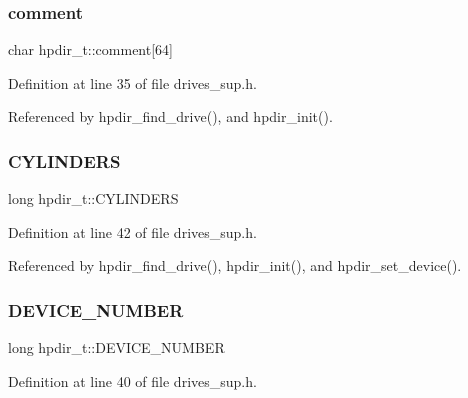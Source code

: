 \mbox{\label{structhpdir__t_aa2ba4f9a627c74e84a515e8ac4893bfb}} 
\subsubsection{\texorpdfstring{comment}{comment}}
{\footnotesize\ttfamily char hpdir\+\_\+t\+::comment\mbox{[}64\mbox{]}}



Definition at line 35 of file drives\+\_\+sup.\+h.



Referenced by hpdir\+\_\+find\+\_\+drive(), and hpdir\+\_\+init().

\mbox{\label{structhpdir__t_ac153c658b4e5333b529826d125d40e1e}} 
\subsubsection{\texorpdfstring{C\+Y\+L\+I\+N\+D\+E\+RS}{CYLINDERS}}
{\footnotesize\ttfamily long hpdir\+\_\+t\+::\+C\+Y\+L\+I\+N\+D\+E\+RS}



Definition at line 42 of file drives\+\_\+sup.\+h.



Referenced by hpdir\+\_\+find\+\_\+drive(), hpdir\+\_\+init(), and hpdir\+\_\+set\+\_\+device().

\mbox{\label{structhpdir__t_a3e761e4a98a5fdbd789ebf89c50b805f}} 
\subsubsection{\texorpdfstring{D\+E\+V\+I\+C\+E\+\_\+\+N\+U\+M\+B\+ER}{DEVICE\_NUMBER}}
{\footnotesize\ttfamily long hpdir\+\_\+t\+::\+D\+E\+V\+I\+C\+E\+\_\+\+N\+U\+M\+B\+ER}



Definition at line 40 of file drives\+\_\+sup.\+h.




